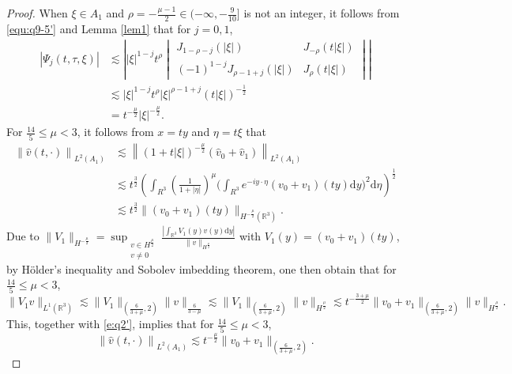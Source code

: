 \documentclass[11pt,twoside]{article}
\newcommand{\R}{\mathbb R}
\newcommand{\f}{\frac}
\theoremstyle{plain}
\theoremstyle{definition}
\theoremstyle{remark}
\numberwithin{equation}{section}
\begin{document}
\begin{proof}
When $\xi\in A_1$ and $\rho=-\f{\mu-1}{2}\in(-\infty,-\f{9}{10}]$ is not an integer, it follows from \eqref{equ:q9-5'}
and Lemma \ref{lem1} that for $j=0,1$,
\begin{equation}\label{e:q49}
\begin{aligned}
|\Psi_j(t,\tau,\xi)|
&\lesssim\left| |\xi|^{1-j} t^{\rho}
\begin{vmatrix}
J_{1-\rho-j}(|\xi|) & J_{-\rho}(t|\xi|) \\
(-1)^{1-j}J_{\rho-1+j}(|\xi|) & J_{\rho}(t|\xi|)
\end{vmatrix} \right|\\
&\lesssim |\xi|^{1-j} t^{\rho}|\xi|^{\rho-1+j}(t|\xi|)^{-\f12}\\
&= t^{-\f{\mu}{2}}|\xi|^{-\f{\mu}{2}}.
\end{aligned}
\end{equation}
For $\f{14}{5}\leq\mu<3$, it follows from
$x=ty$ and $\eta=t\xi$ that
\begin{equation}\label{e:q2'}
\begin{aligned}
\left\|\hat{v}(t, \cdot)\right\|_{L^2(A_1)} & \lesssim\left\|(1+t|\xi|)^{-\f{\mu}{2}}(\hat{v}_{0}+\hat{v}_{1})\right\|_{L^{2}(A_1)} \\
& \lesssim t^{\f32}\left(\int_{R^3} (\frac{1}{1+|\eta|})^\mu\big(\int_{R^3} e^{-i y \cdot \eta} (v_0+v_1)(ty) \mathrm{d} y\big)^2 \mathrm{d} \eta\right)^{\frac{1}{2}}\\
& \lesssim t^{\f32}\|(v_0+v_1)(ty)\|_{H^{-\f{\mu}{2}}(\R^3)}.
\end{aligned}
\end{equation}
Due to $\|V_1\|_{H^{-\f{\mu}{2}}}=\sup _{\substack{v \in H^{\f{\mu}{2}} \\ v \neq 0}} \frac{\left|\int_{\mathbb{R}^3} V_1(y) v(y) \mathrm{d} y\right|}{\|v\|_{H^{\f{\mu}{2}}}}$ with $V_1(y)=(v_0+v_1)(ty)$, by
 H\"{o}lder's inequality and Sobolev imbedding theorem, one then obtain that for $\f{14}{5}\leq\mu<3$,
\begin{equation}\label{e:q3'}
\|V_1 v\|_{L^1(\R^3)} \lesssim\|V_1\|_{(\f{6}{3+\mu}, 2)}\|v\|_{\f{6}{3-\mu}} \lesssim\|V_1\|_{(\f{6}{3+\mu}, 2)}\|v\|_{H^{\f{\mu}{2}}}\lesssim t^{-\f{3+\mu}{2}}\|v_0+v_1\|_{(\f{6}{3+\mu}, 2)}\|v\|_{H^{\f{\mu}{2}}}.
\end{equation}
This, together with  \eqref{e:q2'}, implies that for $\f{14}{5}\leq\mu<3$,
\begin{equation}\label{e:q4'}
\left\|\hat{v}(t, \cdot)\right\|_{L^2(A_1)}\lesssim t^{-\f{\mu}{2}}\|v_0+v_1\|_{(\f{6}{3+\mu}, 2)}.
\end{equation}

\end{proof}
\end{document}
